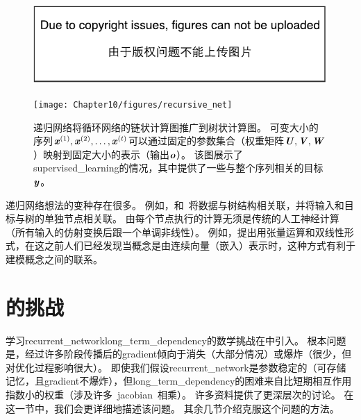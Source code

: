 
\begin{figure}[!htb]
\ifOpenSource
\centerline{\includegraphics{figure.pdf}}
\else
\centerline{\texttt{[image: Chapter10/figures/recursive\_net]}}
\fi
\caption{递归网络将循环网络的链状计算图推广到树状计算图。
可变大小的序列$\boldsymbol{\mathit{x}}^{(1)},\boldsymbol{\mathit{x}}^{(2)},\dots,\boldsymbol{\mathit{x}}^{(t)}$可以通过固定的参数集合（权重矩阵$\boldsymbol{\mathit{U}},\boldsymbol{\mathit{V}},\boldsymbol{\mathit{W}}$）映射到固定大小的表示（输出$\boldsymbol{\mathit{o}}$）。
该图展示了\gls{supervised_learning}的情况，其中提供了一些与整个序列相关的目标$\boldsymbol{\mathit{y}}$。
}
\label{fig:chap10_recursive_net}
\end{figure}

递归网络想法的变种存在很多。
例如，\cite{Frasconi97}和~\cite{Frasconi-1998}将数据与树结构相关联，并将输入和目标与树的单独节点相关联。
由每个节点执行的计算无须是传统的人工神经计算（所有输入的仿射变换后跟一个单调非线性）。
例如，\cite{Socher-et-al-EMNLP2013}提出用张量运算和双线性形式，在这之前人们已经发现当概念是由连续向量（嵌入）表示时，这种方式有利于建模概念之间的联系\citep{Weston+Bengio+Usunier-2010,Bordes-et-al-AISTATS2012-small}。

\section{的挑战}
\label{sec:the_challenge_of_long_term_dependencies}
学习\gls{recurrent_network}\gls{long_term_dependency}的数学挑战在中引入。
根本问题是，经过许多阶段传播后的\gls{gradient}倾向于消失（大部分情况）或爆炸（很少，但对优化过程影响很大）。
即使我们假设\gls{recurrent_network}是参数稳定的（可存储记忆，且\gls{gradient}不爆炸），但\gls{long_term_dependency}的困难来自比短期相互作用指数小的权重（涉及许多~\gls{jacobian}~相乘）。
许多资料提供了更深层次的讨论\citep{Hochreiter91-small,Doya93,Bengio1994ITNN,Pascanu+al-ICML2013-small}。
在这一节中，我们会更详细地描述该问题。
其余几节介绍克服这个问题的方法。


